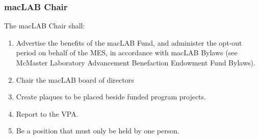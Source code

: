 
\subsubsection{macLAB Chair}
\label{maclab-chair}

The macLAB Chair shall:

\begin{enumerate}
 \item
  Advertise the benefits of the macLAB Fund, and administer the opt-out period on behalf of the MES, in accordance with macLAB Bylaws (see McMaster Laboratory Advancement Benefaction Endowment Fund Bylaws).
 \item
  Chair the macLAB board of directors
 \item
  Create plaques to be placed beside funded program projects.
 \item
  Report to the VPA.
 \item
  Be a position that must only be held by one person.

\end{enumerate}